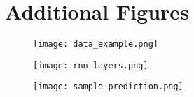 \documentclass{article}
\begin{document}
\section{Additional Figures}

\begin{figure}[H]
\centering
\texttt{[image: data\_example.png]}
\end{figure}

\begin{figure}[H]
\centering
\texttt{[image: rnn\_layers.png]}
\end{figure}

\begin{figure}[H]
\centering
\texttt{[image: sample\_prediction.png]}
\end{figure}
\end{document}
